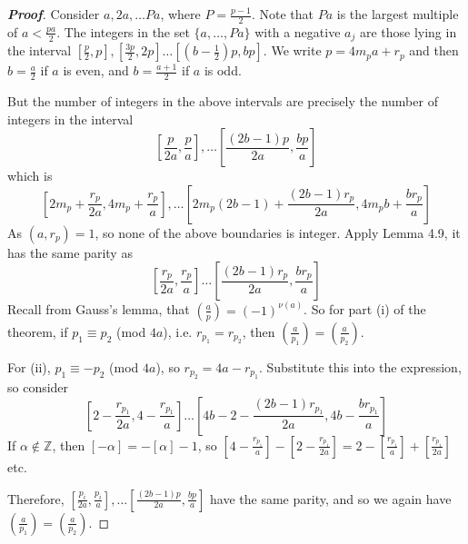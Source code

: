 \begin{proof}[\bf Proof] Consider $a,2a,\ldots Pa$, where $P=\frac{p-1}{2}$. Note that $Pa$ is the largest multiple of $a<\frac{pa}{2}$. The integers in the set $\{a,\ldots, Pa\}$ with a negative $a_j$ are those lying in the interval $[\frac{p}{2},p],[\frac{3p}{2},2p] \ldots [(b-\frac{1}{2})p,bp]$. We write $p=4m_p a +r_p$ and then $b=\frac{a}{2}$ if $a$ is even, and $b=\frac{a+1}{2}$ if $a$ is odd.

But the number of integers in the above intervals are precisely the number of integers in the interval
$$\left[\frac{p}{2a},\frac{p}{a}\right],\ldots \left[\frac{(2b-1)p}{2a},\frac{bp}{a}\right]$$
which is $$\left[2m_p+\frac{r_p}{2a},4m_p+\frac{r_p}{a}\right], \ldots \left[2m_p(2b-1)+\frac{(2b-1)r_p}{2a},4m_pb+\frac{b r_p}{a}\right]$$
As $(a,r_p)=1$, so none of the above boundaries is integer. Apply Lemma 4.9, it has the same parity as
$$\left[\frac{r_p}{2a},\frac{r_p}{a}\right] \ldots \left[\frac{(2b-1)r_p}{2a},\frac{br_p}{a}\right]$$
Recall from Gauss's lemma, that $(\frac{a}{p})=(-1)^{\nu(a)}$.
So for part (i) of the theorem, if $p_1 \equiv p_2$ (mod $4a$), i.e. $r_{p_1} =r_{p_2}$, then
$(\frac{a}{p_1})=(\frac{a}{p_2})$.

For (ii), $p_1 \equiv -p_2$ (mod $4a$), so $r_{p_2}=4a-r_{p_1}$. Substitute this into the expression,
so consider $$\left[2-\frac{r_{p_1}}{2a},4-\frac{r_{p_1}}{a}\right] \ldots \left[4b-2-\frac{(2b-1)r_{p_1}}{2a},4b-\frac{br_{p_1}}{a}\right]$$
If $\alpha \not \in \mathbb{Z}$, then $[-\alpha]=-[\alpha]-1$, so $[4-\frac{r_{p_1}}{a}]-[2-\frac{r_{p_1}}{2a}]=2-[\frac{r_{p_1}}{a}]+[\frac{r_{p_1}}{2a}]$ etc.

Therefore, $[\frac{p_i}{2a},\frac{p_i}{a}],\ldots [\frac{(2b-1)p}{2a},\frac{bp}{a}]$  have the same parity, and so we again have $(\frac{a}{p_1})=(\frac{a}{p_2})$.
\end{proof}

